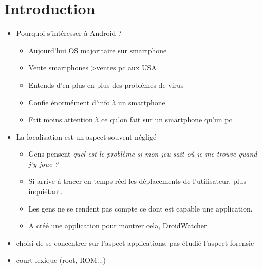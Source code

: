 
\section*{Introduction}
\label{sec:andro-into}

\begin{itemize}
\item Pourquoi s'intéresser à Android ?
  \begin{itemize}
  \item Aujourd'hui OS majoritaire sur smartphone
  \item Vente smartphones \textgreater ventes pc aux USA
  \item Entends d'en plus en plus des problèmes de virus
  \item Confie énormément d'info à un smartphone
  \item Fait moins attention à ce qu'on fait sur un smartphone qu'un pc
  \end{itemize}
\item La localisation est un aspect souvent négligé
  \begin{itemize}
  \item Gens pensent \emph{quel est le problème si mon jeu sait où je me trouve quand j'y joue ?}
  \item Si arrive à tracer en temps réel les déplacements de l'utilisateur, plus inquiétant.
  \item Les gens ne se rendent pas compte ce dont est capable une application.
  \item A créé une application pour montrer cela, DroidWatcher
  \end{itemize}
\item choisi de se concentrer sur l'aspect applications, pas étudié l'aspect forensic
\item court lexique (root, ROM...)
\end{itemize}